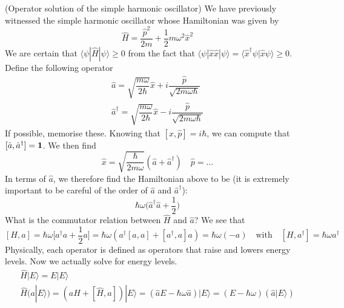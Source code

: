 \begin{thm}
(Operator solution of the simple harmonic oscillator) We have previously witnessed the simple harmonic oscillator whose Hamiltonian was given by
\[\hat{H}=\dfrac{\hat{p}^2}{2m}+\dfrac{1}{2}m\omega ^2\hat{x}^2\]
We are certain that $\langle \psi |\hat{H}|\psi \rangle\geq 0 $ from the fact that $\langle \psi |\hat{x}\hat{x}|\psi \rangle =\langle \hat{x}^{\dagger}\psi |\hat{x}\psi \rangle \geq 0$. Define the following operator
\begin{align*}
\hat{a}=\sqrt{\dfrac{m\omega }{2\hbar }}\hat{x}+i\dfrac{\hat{p}}{\sqrt{2m\omega \hbar }}\\
\hat{a}^{\dagger}=\sqrt{\dfrac{m\omega }{2\hbar }}\hat{x}-i\dfrac{\hat{p}}{\sqrt{2m\omega \hbar }}
\end{align*}
If possible, memorise these. Knowing that $[\hat{x},\hat{p}]=i\hbar $, we can compute that $[\hat{a},\hat{a}^{\dagger}]={\bf 1}$. We then find
\[\hat{x}=\sqrt{\dfrac{\hbar }{2m\omega }}(\hat{a}+\hat{a}^{\dagger})\quad \hat{p}=\ldots \]
In terms of $\hat{a}$, we therefore find the Hamiltonian above to be (it is extremely important to be careful of the order of $\hat{a}$ and $\hat{a}^{\dagger}$):
\[\hbar \omega \Big(\hat{a}^{\dagger}\hat{a}+\dfrac{1}{2}\Big)\]
What is the commutator relation between $\hat{H}$ and $\hat{a}$? We see that
\[[H,a]=\hbar \omega \Big[a^{\dagger}a+\dfrac{1}{2}a\Big]=\hbar \omega (a^{\dagger}[a,a]+[a^{\dagger},a]a)=\hbar \omega (-a)\quad\mathrm{with}\quad [H,a^{\dagger}]=\hbar \omega a^{\dagger}\]
Physically, each operator is defined as operators that raise and lowers energy levels. Now we actually solve for energy levels.
\begin{align*}
\hat{H}|E\rangle =E|E\rangle \\
\hat{H}(a|E\rangle )=(aH+[\hat{H},a])|E\rangle =(\hat{a}E-\hbar \omega \hat{a})|E\rangle =(E-\hbar \omega )(\hat{a}|E\rangle )
\end{align*}

\end{thm}
\vspace{2ex}

